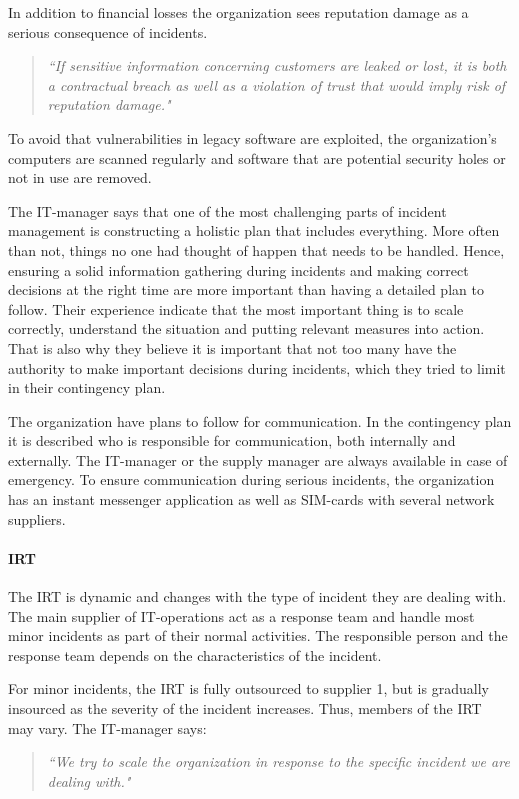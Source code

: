 In addition to financial losses the organization sees reputation damage as a serious consequence of incidents. 
\begin{quote}
\textit{``If sensitive information concerning customers are leaked or lost, it is both a contractual breach as well as a violation of trust that would imply risk of reputation damage."}
\end{quote}

To avoid that vulnerabilities in legacy software are exploited, the organization's computers are scanned regularly and software that are potential security holes or not in use are removed. 

The IT-manager says that one of the most challenging parts of incident management is constructing a holistic plan that includes everything. More often than not, things no one had thought of happen that needs to be handled. Hence, ensuring a solid information gathering during incidents and making correct decisions at the right time are more important than having a detailed plan to follow. Their experience indicate that the most important thing is to scale correctly, understand the situation and putting relevant measures into action. That is also why they believe it is important that not too many have the authority to make important decisions during incidents, which they tried to limit in their contingency plan.

The organization have plans to follow for communication. In the contingency plan it is described who is responsible for communication, both internally and externally. The IT-manager or the supply manager are always available in case of emergency. To ensure communication during serious incidents, the organization has an instant messenger application as well as SIM-cards with several network suppliers. 

\paragraph{\acl{IRT}}
The \ac{IRT} is dynamic and changes with the type of incident they are dealing with. The main supplier of IT-operations act as a response team and handle most minor incidents as part of their normal activities. The responsible person and the response team depends on the characteristics of the incident.   

For minor incidents, the \ac{IRT} is fully outsourced to supplier 1, but is gradually insourced as the severity of the incident increases. Thus, members of the \ac{IRT} may vary. The IT-manager says:
\begin{quote}
\textit{``We try to scale the organization in response to the specific incident we are dealing with."}
\end{quote}

